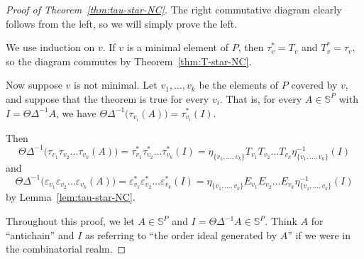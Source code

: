 \documentclass[ALCO,ThmDefs,Unicode,epreuves]{cedram}
\newcommand{\bbs}{\mathbb{S}}
\newcommand{\e}{\varepsilon}
\newcommand{\up}{\Delta}
\begin{document}
\begin{proof}[Proof of Theorem~\ref{thm:tau-star-NC}]
The right commutative diagram clearly follows from the left, so we will simply prove the left.

We use induction on $v$. If $v$ is a minimal element of $P$, then $\tau_v^*=T_v$ and $T_v^*=\tau_v$, so the diagram commutes by Theorem~\ref{thm:T-star-NC}.

Now suppose $v$ is not minimal. Let $v_1,\dots,v_k$ be the elements of $P$ covered by $v$, and suppose that the theorem is true for every $v_i$. That is, for every $A\in\bbs^P$ with $I=\Theta\up^{-1}A$, we have $\Theta\up^{-1}\big(\tau_{v_i}(A)\big)=\tau_{v_i}^*(I)$.

Then 
\[
\Theta\up^{-1}\big(\tau_{v_1}\tau_{v_2}\dots \tau_{v_k}(A)\big)=\tau_{v_1}^*\tau_{v_2}^*\dots \tau_{v_k}^*(I)
= \eta_{\{v_1,\dots,v_k\}} T_{v_1}T_{v_2}\dots T_{v_k} \eta_{\{v_1,\dots,v_k\}}^{-1}(I)
\]
and 
\[
\Theta\up^{-1}\big(\e_{v_1}\e_{v_2}\dots \e_{v_k}(A)\big)=\e_{v_1}^*\e_{v_2}^*\dots \e_{v_k}^*(I)
= \eta_{\{v_1,\dots,v_k\}} E_{v_1}E_{v_2}\dots E_{v_k} \eta_{\{v_1,\dots,v_k\}}^{-1}(I)
\]
by Lemma~\ref{lem:tau-star-NC}.

Throughout this proof, we let $A\in\bbs^P$ and
$I=\Theta\up^{-1}A\in\bbs^P$. Think $A$ for ``antichain'' and $I$ as referring to ``the order ideal generated by $A$''
if we were in the combinatorial realm.


\end{proof}
\end{document}
